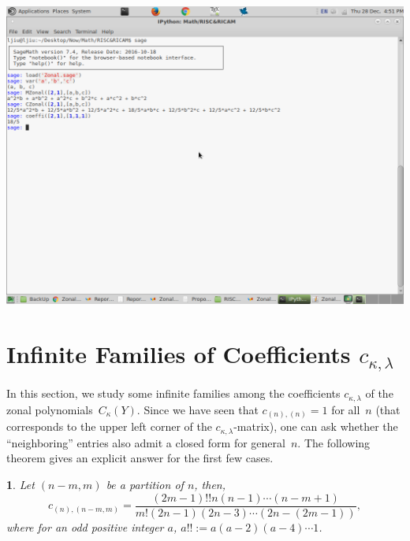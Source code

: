 \documentclass[10pt,oneside,american]{amsart}
\numberwithin{equation}{section}
\numberwithin{figure}{section}
\theoremstyle{definition}
\theoremstyle{remark}
\theoremstyle{plain}
\theoremstyle{definition}
\theoremstyle{plain}
\newtheorem{thm}{\protect\theoremname}[section]
\theoremstyle{plain}
\theoremstyle{plain}
\providecommand{\theoremname}{Theorem}
\begin{document}
\includegraphics[scale=0.3]{ScreenShot}


\section{Infinite Families of Coefficients $c_{\kappa,\lambda}$}

In this section, we study some infinite families among the coefficients
$c_{\kappa,\lambda}$ of the zonal polynomials~$C_{\kappa}(Y)$. Since we have
seen that $c_{(n),(n)}=1$ for all~$n$ (that corresponds to the upper left
corner of the $c_{\kappa,\lambda}$-matrix), one can ask whether the
``neighboring'' entries also admit a closed form for general~$n$.  The
following theorem gives an explicit answer for the first few cases.


\begin{thm}
Let $\left(n-m,m\right)$ be a partition of $n$, then, 
\begin{equation}
c_{\left(n\right),\left(n-m,m\right)}=\frac{\left(2m-1\right)!!n\left(n-1\right)\cdots\left(n-m+1\right)}{m!\left(2n-1\right)\left(2n-3\right)\cdots\left(2n-\left(2m-1\right)\right)} \label{eq:1to2},
\end{equation}
where for an odd positive integer $a$, $a!!:=a\left(a-2\right)\left(a-4\right)\cdots1$. 
\end{thm}
\end{document}
